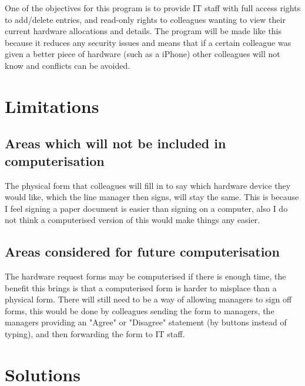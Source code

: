 One of the objectives for this program is to provide IT staff with full access rights to add/delete entries, and read-only rights to colleagues wanting to view their current hardware allocations and details. The program will be made like this because it reduces any security issues and means that if a certain colleague was given a better piece of hardware (such as a iPhone) other colleagues will not know and conflicts can be avoided.

\section{Limitations}

\subsection{Areas which will not be included in computerisation}

The physical form that colleagues will fill in to say which hardware device they would like, which the line manager then signs, will stay the same. This is because I feel signing a paper document is easier than signing on a computer, also I do not think a computerised version of this would make things any easier.

\subsection{Areas considered for future computerisation}

The hardware request forms may be computerised if there is enough time, the benefit this brings is that a computerised form is harder to misplace than a physical form. There will still need to be a way of allowing managers to sign off forms, this would be done by colleagues sending the form to managers, the managers providing an "Agree" or "Disagree" statement (by buttons instead of typing), and then forwarding the form to IT staff.

\section{Solutions}

